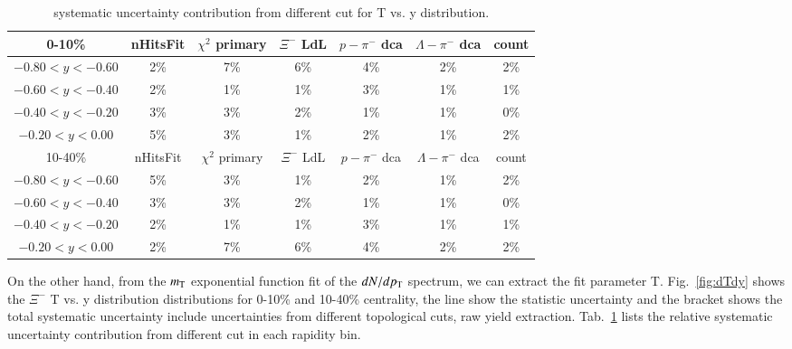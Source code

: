 \begin{table}[]
    \centering
    \begin{tabular}{|c|c|c|c|c|c|c|}
    \hline
        0-10\% & nHitsFit & $\chi^{2}$ primary & $\Xi^{-}$ LdL & $p-\pi^{-}$ dca & $\Lambda-\pi^{-}$ dca & count \\ \hline
        $-0.80<y<-0.60$ &2\% & 7\% & 6\% & 4\% & 2\% & 2\%   \\
        $-0.60<y<-0.40$ &2\% & 1\% & 1\% & 3\% & 1\% & 1\%   \\
        $-0.40<y<-0.20$ &3\% & 3\% & 2\% & 1\% & 1\% & 0\%   \\
        $-0.20<y<0.00$  &5\% & 3\% & 1\% & 2\% & 1\% & 2\%   \\
        \hline
        10-40\% & nHitsFit & $\chi^{2}$ primary & $\Xi^{-}$ LdL & $p-\pi^{-}$ dca & $\Lambda-\pi^{-}$ dca & count \\ \hline
        $-0.80<y<-0.60$ &5\% & 3\% & 1\% & 2\% & 1\% & 2\%   \\
        $-0.60<y<-0.40$ &3\% & 3\% & 2\% & 1\% & 1\% & 0\%   \\
        $-0.40<y<-0.20$ &2\% & 1\% & 1\% & 3\% & 1\% & 1\%   \\
        $-0.20<y<0.00$  &2\% & 7\% & 6\% & 4\% & 2\% & 2\%   \\
        \hline
    \end{tabular}
    \caption{systematic uncertainty contribution from different cut for T vs. y distribution.}
    \label{tab:syserr_dTdy}
\end{table}
On the other hand, from the $m_{\rm T}$ exponential function fit of the $dN/dp_{\rm T}$ spectrum, we can extract the fit parameter T. Fig.~\ref{fig:dTdy} shows the $\Xi^{-}$ T vs. y distribution distributions for 0-10\% and 10-40\% centrality, the line show the statistic uncertainty and the bracket shows the total systematic uncertainty include uncertainties from different topological cuts, raw yield extraction. Tab.~\ref{tab:syserr_dTdy} lists the relative systematic uncertainty contribution from different cut in each rapidity bin. 


